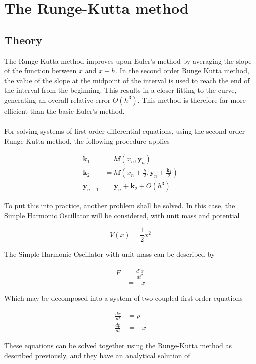 \documentclass[pdf,color]{UoBnote}
\begin{document}
\section{The Runge-Kutta method}
	\subsection{Theory}
	The Runge-Kutta method improves upon Euler's method by averaging the slope of the function between $x$ and $x + h$. In the second order Runge Kutta method, the value of the slope at the midpoint of the interval is used to reach the end of the interval from the beginning. This results in a closer fitting to the curve, generating an overall relative error $O(h^3)$. This method is therefore far more efficient than the basic Euler's method.\\
	\\
	For solving systems of first order differential equations, using the second-order Runge-Kutta method, the following procedure applies
	
	\begin{align}
	\mathbf{k}_1 & = h\mathbf{f}(x_n,\mathbf{y}_n)\\
	\mathbf{k}_2 & = h\mathbf{f}(x_n + \frac{h}{2},\mathbf{y}_n + \frac{\mathbf{k}_1}{2})\\
	\mathbf{y}_{n+1} & = \mathbf{y}_n + \mathbf{k}_2 + O(h^3)
\end{align}		
	
	To put this into practice, another problem shall be solved. In this case, the Simple Harmonic Oscillator will be considered, with unit mass and potential
	
	\begin{equation}
	V(x) = \frac{1}{2}x^2
	\end{equation}
	
	The Simple Harmonic Oscillator with unit mass can be described by
	
	\begin{align}
	F &= \frac{d^{2}x}{dt^2}\\
		&= -x
	\end{align}
	
	Which may be decomposed into a system of two coupled  first order equations
	
	\begin{align}
	\frac{dx}{dt} & = p\\
	\frac{dp}{dt} & = -x
	\end{align}
	
	These equations can be solved together using the Runge-Kutta method as described previously, and they have an analytical solution of
	
\end{document}
